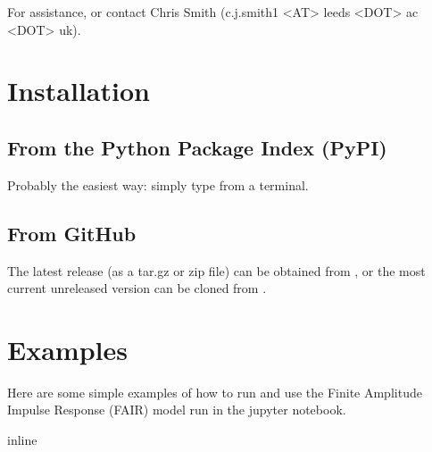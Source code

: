 \documentclass[letterpaper,10pt,english]{sphinxmanual}
\begin{document}
For assistance,  or contact Chris Smith (c.j.smith1 \textless{}AT\textgreater{} leeds \textless{}DOT\textgreater{} ac \textless{}DOT\textgreater{} uk).


\chapter{Installation}
\label{\detokenize{installation:installation}}\label{\detokenize{installation::doc}}

\section{From the Python Package Index (PyPI)}
\label{\detokenize{installation:from-the-python-package-index-pypi}}
Probably the easiest way: simply type  from a terminal.


\section{From GitHub}
\label{\detokenize{installation:from-github}}
The latest release (as a tar.gz or zip file) can be obtained from , or the most current unreleased version can be cloned from .


\chapter{Examples}
\label{\detokenize{examples::doc}}\label{\detokenize{examples:examples}}
Here are some simple examples of how to run and use the Finite Amplitude
Impulse Response (FAIR) model run in the jupyter notebook.

\begin{sphinxVerbatim}[commandchars=\\\{\}]
 inline
\end{sphinxVerbatim}

\begin{sphinxVerbatim}[commandchars=\\\{\}]
 

   

     
\PYG{p}{[}\PYG{p}{]}   
\end{sphinxVerbatim}
\end{document}
